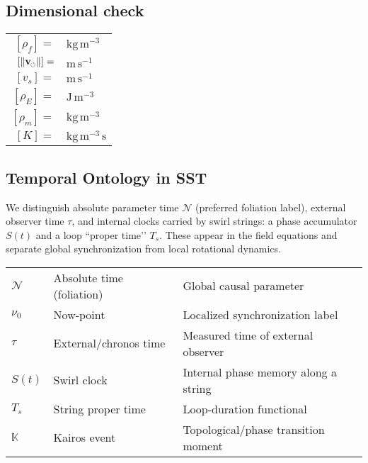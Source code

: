 \documentclass[11pt]{article}
\newcommand{\swirlarrow}{%
	\mathchoice{\mkern-2mu\scriptstyle\boldsymbol{\circlearrowleft}}%
	{\mkern-2mu\scriptstyle\boldsymbol{\circlearrowleft}}%
	{\mkern-2mu\scriptscriptstyle\boldsymbol{\circlearrowleft}}%
	{\mkern-2mu\scriptscriptstyle\boldsymbol{\circlearrowleft}}%
}
\newcommand{\vswirl}{\mathbf{v}_{\swirlarrow}}
\newcommand{\vscore}{v_s}                                %
\newcommand{\vnorm}{\lVert \vswirl \rVert}               %
\newcommand{\rhoF}{\rho_{\!f}}                           %
\newcommand{\rhoE}{\rho_{\!E}}                           %
\newcommand{\rhoM}{\rho_{\!m}}                           %
\begin{document}
	\subsection*{Dimensional check}
	\begin{center}
		\renewcommand{\arraystretch}{1.1}
		\begin{tabularx}{0.7\linewidth}{@{}rl@{}}
			$[\rhoF]=$   & $\mathrm{kg\,m^{-3}}$\\
			$[\vnorm]=$  & $\mathrm{m\,s^{-1}}$\\
			$[\vscore]=$ & $\mathrm{m\,s^{-1}}$\\
			$[\rhoE]=$   & $\mathrm{J\,m^{-3}}$\\
			$[\rhoM]=$   & $\mathrm{kg\,m^{-3}}$\\
			$[K]=$       & $\mathrm{kg\,m^{-3}\,s}$\\
		\end{tabularx}
	\end{center}

	\subsection*{Temporal Ontology in SST}
		We distinguish absolute parameter time $\mathcal{N}$ (preferred foliation label), external observer time $\tau$, and internal clocks carried by swirl strings: a phase accumulator $S(t)$ and a loop “proper time’’ $T_{\!s}$. These appear in the field equations and separate global synchronization from local rotational dynamics.

			\begin{center}
				\scriptsize
				\begin{tabular}{lll}
						$\mathcal{N}$ & Absolute time (foliation) & Global causal parameter \\
						$\nu_0$       & Now-point                 & Localized synchronization label \\
						$\tau$        & External/chronos time     & Measured time of external observer \\
						$S(t)$        & Swirl clock               & Internal phase memory along a string \\
						$T_{\!s}$     & String proper time        & Loop-duration functional \\
						$\mathbb{K}$  & Kairos event              & Topological/phase transition moment \\
                \end{tabular}
			\end{center}
\end{document}
